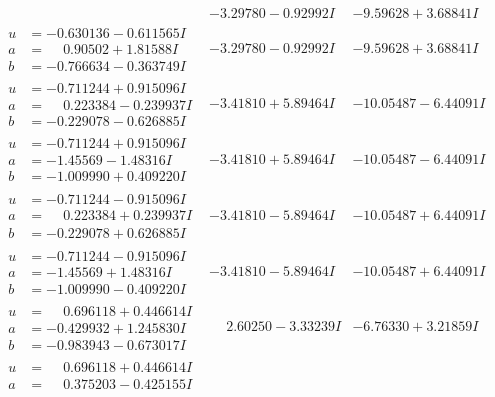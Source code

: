 \documentclass[1p]{elsarticle_modified}
\theoremstyle{definition}
\begin{document}
$$\begin{array}{c|c|c}
 & -3.29780 - 0.92992 I & -9.59628 + 3.68841 I \\ \hline\begin{aligned}
u &= -0.630136 - 0.611565 I \\
a &= \phantom{-}0.90502 + 1.81588 I \\
b &= -0.766634 - 0.363749 I\end{aligned}
 & -3.29780 - 0.92992 I & -9.59628 + 3.68841 I \\ \hline\begin{aligned}
u &= -0.711244 + 0.915096 I \\
a &= \phantom{-}0.223384 - 0.239937 I \\
b &= -0.229078 - 0.626885 I\end{aligned}
 & -3.41810 + 5.89464 I & -10.05487 - 6.44091 I \\ \hline\begin{aligned}
u &= -0.711244 + 0.915096 I \\
a &= -1.45569 - 1.48316 I \\
b &= -1.009990 + 0.409220 I\end{aligned}
 & -3.41810 + 5.89464 I & -10.05487 - 6.44091 I \\ \hline\begin{aligned}
u &= -0.711244 - 0.915096 I \\
a &= \phantom{-}0.223384 + 0.239937 I \\
b &= -0.229078 + 0.626885 I\end{aligned}
 & -3.41810 - 5.89464 I & -10.05487 + 6.44091 I \\ \hline\begin{aligned}
u &= -0.711244 - 0.915096 I \\
a &= -1.45569 + 1.48316 I \\
b &= -1.009990 - 0.409220 I\end{aligned}
 & -3.41810 - 5.89464 I & -10.05487 + 6.44091 I \\ \hline\begin{aligned}
u &= \phantom{-}0.696118 + 0.446614 I \\
a &= -0.429932 + 1.245830 I \\
b &= -0.983943 - 0.673017 I\end{aligned}
 & \phantom{-}2.60250 - 3.33239 I & -6.76330 + 3.21859 I \\ \hline\begin{aligned}
u &= \phantom{-}0.696118 + 0.446614 I \\
a &= \phantom{-}0.375203 - 0.425155 I \\

\end{aligned}
\end{array}$$
\end{document}
